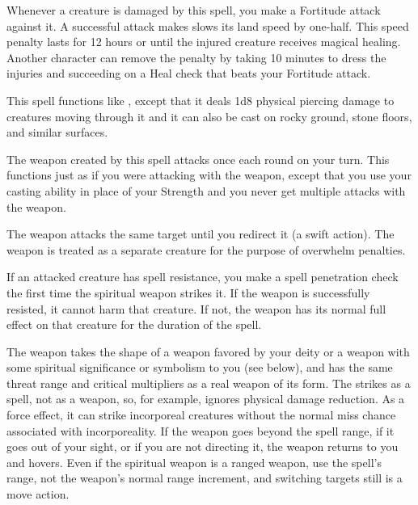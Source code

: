Whenever a creature is damaged by this spell, you make a Fortitude attack against it. A successful attack makes slows its land speed by one-half. This speed penalty lasts for 12 hours or until the injured creature receives magical healing. Another character can remove the penalty by taking 10 minutes to dress the injuries and succeeding on a Heal check that beats your Fortitude attack.

\spelleffect This spell functions like , except that it deals 1d8 physical piercing damage to creatures moving through it and it can also be cast on rocky ground, stone floors, and similar surfaces.

\spellrng{\rngmed}
\spelldur{\durshort \dismissable}
\spelleffect The weapon created by this spell attacks once each round on your turn. This functions just as if you were attacking with the weapon, except that you use your casting ability in place of your Strength and you never get multiple attacks with the weapon.
\par The weapon attacks the same target until you redirect it (a swift action). The weapon is treated as a separate creature for the purpose of overwhelm penalties.
\par If an attacked creature has spell resistance, you make a spell penetration check the first time the spiritual weapon strikes it. If the weapon is successfully resisted, it cannot harm that creature. If not, the weapon has its normal full effect on that creature for the duration of the spell.
\par The weapon takes the shape of a weapon favored by your deity or a weapon with some spiritual significance or symbolism to you (see below), and has the same threat range and critical multipliers as a real weapon of its form.
\spellnotes The  strikes as a spell, not as a weapon, so, for example, ignores physical damage reduction. As a force effect, it can strike incorporeal creatures without the normal miss chance associated with incorporeality. If the weapon goes beyond the spell range, if it goes out of your sight, or if you are not directing it, the weapon returns to you and hovers. Even if the spiritual weapon is a ranged weapon, use the spell's range, not the weapon's normal range increment, and switching targets still is a move action.
